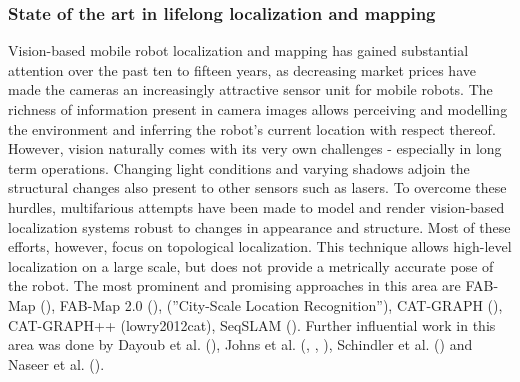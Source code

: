 


\subsubsection{State of the art in lifelong localization and mapping}
Vision-based mobile robot localization and mapping has gained substantial attention over the past ten to fifteen years, as decreasing market prices have made the  cameras an increasingly attractive sensor unit for mobile robots. The richness of information present in camera images allows perceiving and modelling the environment and inferring the robot's current location with respect thereof. However, vision naturally comes with its very own challenges - especially in long term operations. Changing light conditions and varying shadows adjoin the structural changes also present to other sensors such as lasers. To overcome these hurdles, multifarious attempts have been made to model and render vision-based localization systems robust to changes in appearance and structure. Most of these efforts, however, focus on topological localization. This technique allows high-level localization on a large scale, but does not provide a metrically accurate pose of the robot. The most prominent and promising approaches in this area are FAB-Map (\cite{cummins2008fab}), FAB-Map 2.0 (\cite{cummins2011appearance}), (''City-Scale Location Recognition''), CAT-GRAPH (\cite{maddern2013towards}), CAT-GRAPH++ (lowry2012cat), SeqSLAM (\cite{milford2012seqslam}). Further influential work in this area was done by Dayoub et al. (\cite{dayoub2008adaptive}), Johns et al. (\cite{johns2013feature}, \cite{johns2013dynamic}, \cite{johns2014generative}),  Schindler et al. (\cite{schindler2007city}) and Naseer et al. (\cite{naseer2014robust}).

